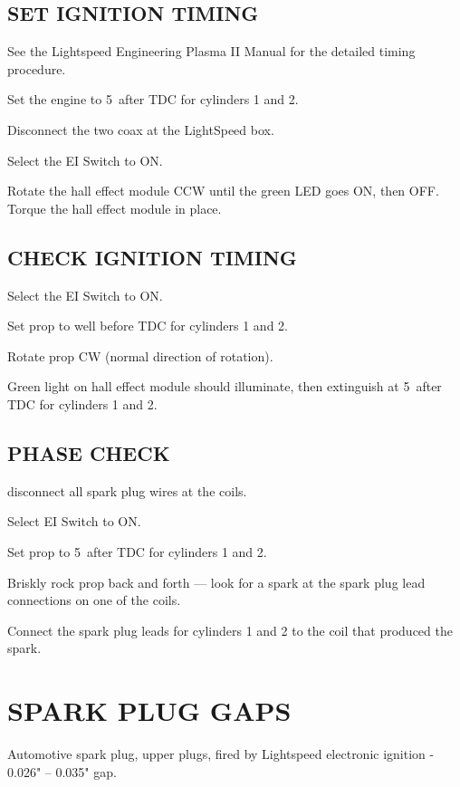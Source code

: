 \subsection{SET IGNITION TIMING} 
\begin{enumerate*}
	\item See the Lightspeed Engineering Plasma II Manual for the detailed timing procedure. 
	\item Set the engine to 5\textdegree ~after TDC for cylinders 1 and 2.
	\item Disconnect the two coax at the LightSpeed box.
	\item Select the EI Switch to ON.
	\item Rotate the hall effect module CCW until the green LED goes ON, then OFF. Torque the hall effect module in place.
\end{enumerate*}
\subsection{CHECK IGNITION TIMING} 
\begin{enumerate*}
	\item Select the EI Switch to ON.
	\item Set prop to well before TDC for cylinders 1 and 2.
	\item Rotate prop CW (normal direction of rotation).
	\item Green light on hall effect module should illuminate, then extinguish at 5\textdegree ~after TDC for cylinders 1 and 2.
\end{enumerate*}

  \subsection{PHASE CHECK} 
  \begin{enumerate*}
  	\item disconnect all spark plug wires at the coils. 
  	\item Select EI Switch to ON. 
  	\item Set prop to 5\textdegree ~after TDC for cylinders 1 and 2. 
  	\item Briskly rock prop back and forth --- look for a spark at the spark plug lead connections on one of the coils. 
  	\item Connect the spark plug leads for cylinders 1 and 2 to the coil that produced the spark.
\end{enumerate*}

\section{SPARK PLUG GAPS}
Automotive spark plug, upper plugs, fired by Lightspeed electronic ignition - 0.026" -- 0.035" gap.

